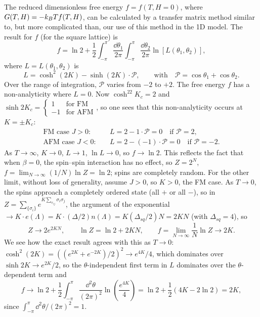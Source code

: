 The reduced dimensionless free energy $f = f(T,H=0)$, where $G(T,H) = -k_{B} Tf(T,H)$, can be calculated
by a transfer matrix method similar to, but more complicated than, our use of this method in the 1D
model. The result for $f$ (for the square lattice) is
\begin{equation}
  f = \ln 2 + \frac{1}{2}\int_{-\pi}^{\pi}\frac{\dd\theta_1}{2\pi}\int_{-\pi}^{\pi}\frac{\dd\theta_2}{2\pi}
      \ln\left[L(\theta_1,\theta_2)\right],
\end{equation}
where $L = L(\theta_1,\theta_2)$ is
\begin{equation}
  L = \cosh^2(2K) - \sinh(2K)\cdot\mathcal{P},\qquad\text{with}\quad \mathcal{P} = \cos\theta_1+\cos\theta_2 .
\end{equation}
Over the range of integration, $\mathcal P$ varies from $-2$ to $+2$. The free energy $f$ has a
non-analyticity where $L = 0$. Now $\cosh^22K_c = 2$ and
$\sinh 2K_c = \begin{cases}1 & \text{for FM}\\ -1 & \text{for AFM}\end{cases}$, so one sees that this
non-analyticity occurs at $K = \pm K_c$:
\begin{align*}
  \text{FM case } J>0:&\quad L = 2 - 1\cdot\mathcal P = 0\quad\text{if } \mathcal P = 2,\\
  \text{AFM case } J<0:&\quad L = 2 - (-1)\cdot\mathcal P = 0\quad\text{if } \mathcal P = -2.
\end{align*}
As $T\to\infty$, $K\to 0$, $L\to 1$, $\ln L\to 0$, so $f\to\ln 2$. This reflects the fact that when
$\beta = 0$, the spin--spin interaction has no effect, so $Z = 2^N$,
$f = \lim_{N\to\infty}(1/N)\ln Z = \ln 2$; spins are completely random. For the other limit, without
loss of generality, assume $J>0$, so $K>0$, the FM case. As $T\to 0$, the spins approach a completely
ordered state (all $+$ or all $-$), so in $Z = \sum_{\{\sigma_i\}}e^{K\sum_{e_{ij}}\sigma_i\sigma_j}$, the
argument of the exponential $\to K\cdot e(\Lambda) = K\cdot(\Delta/2)n(\Lambda) = K(\Delta_{sq}/2)N = 2KN$
(with $\Delta_{sq} = 4$), so
\begin{equation}
  Z\to 2e^{2KN},\qquad \ln Z = \ln 2 + 2KN,\qquad f = \lim_{N\to\infty}\frac{1}{N}\ln Z\to 2K .
\end{equation}
We see how the exact result agrees with this as $T\to 0$:
$\cosh^2(2K) = \left((e^{2K}+e^{-2K})/2\right)^2\to e^{4K}/4$, which dominates over
$\sinh 2K\to e^{2K}/2$, so the $\theta$-independent first term in $L$ dominates over the
$\theta$-dependent term and
\begin{equation}
  f\to\ln 2 + \frac{1}{2}\int_{-\pi}^{\pi}\frac{\dd^2\theta}{(2\pi)^2}\ln\left(\frac{e^{4K}}{4}\right)
  = \ln 2 + \frac{1}{2}(4K - 2\ln 2) = 2K,
\end{equation}
since $\int_{-\pi}^{\pi}\dd^2\theta/(2\pi)^2 = 1$.


